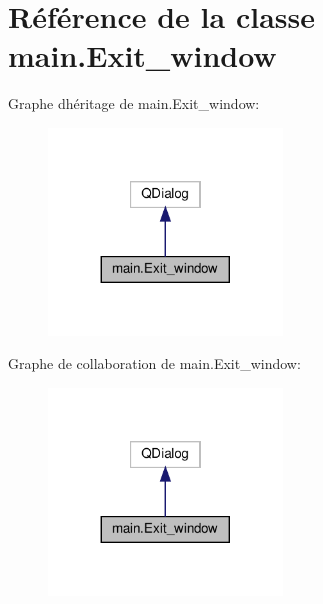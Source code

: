 \hypertarget{classmain_1_1Exit__window}{}\section{Référence de la classe main.\+Exit\+\_\+window}
\label{classmain_1_1Exit__window}


Graphe d\textquotesingle{}héritage de main.\+Exit\+\_\+window\+:
\nopagebreak
\begin{figure}[H]
\begin{center}
\leavevmode
\includegraphics[width=176pt]{classmain_1_1Exit__window__inherit__graph}
\end{center}
\end{figure}


Graphe de collaboration de main.\+Exit\+\_\+window\+:
\nopagebreak
\begin{figure}[H]
\begin{center}
\leavevmode
\includegraphics[width=176pt]{classmain_1_1Exit__window__coll__graph}
\end{center}
\end{figure}
